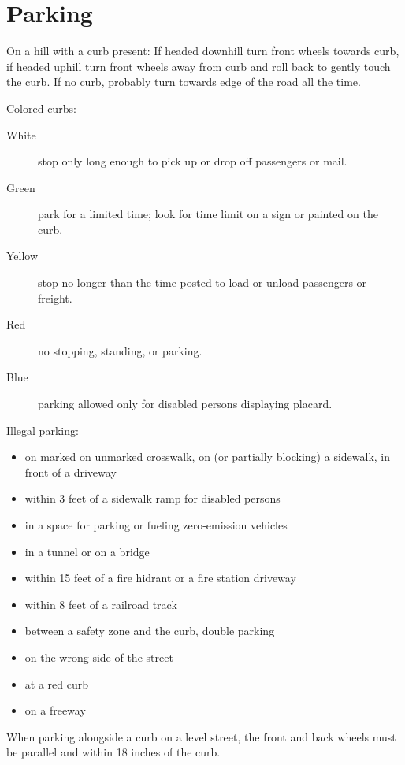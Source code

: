 \section{Parking}

On a hill with a curb present:
If headed downhill turn front wheels towards curb,
if headed uphill turn front wheels away from curb
and roll back to gently touch the curb.
If no curb, probably turn towards edge of the road all the time.

Colored curbs:
\begin{description}
\item[White] stop only long enough to pick up or drop off passengers or mail.
\item[Green] park for a limited time;
look for time limit on a sign or painted on the curb.
\item[Yellow] stop no longer than the time posted
to load or unload passengers or freight.
\item[Red] no stopping, standing, or parking.
\item[Blue] parking allowed only for disabled persons displaying placard.
\end{description}

Illegal parking:
\begin{itemize}
\item on marked on unmarked crosswalk,
on (or partially blocking) a sidewalk, in front of a driveway
\item within 3 feet of a sidewalk ramp for disabled persons
\item in a space for parking or fueling zero-emission vehicles
\item in a tunnel or on a bridge
\item within 15 feet of a fire hidrant or a fire station driveway
\item within 8 feet of a railroad track
\item between a safety zone and the curb, double parking
\item on the wrong side of the street
\item at a red curb
\item on a freeway
\end{itemize}

When parking alongside a curb on a level street,
the front and back wheels must be parallel and within 18 inches of the curb.
